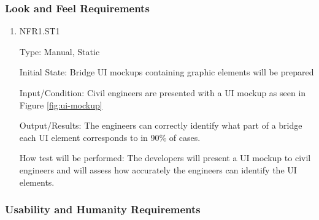 \documentclass[12pt, titlepage]{article}
\begin{document}
\subsubsection{Look and Feel Requirements}

\begin{enumerate}

\item{NFR1.ST1\\}

Type: Manual, Static

Initial State: Bridge UI mockups containing graphic elements will be prepared

Input/Condition: Civil engineers are presented with a UI mockup as seen in Figure \ref{fig:ui-mockup} 

Output/Results: The engineers can correctly identify what part of a bridge each UI element corresponds to in 90\% of cases.

How test will be performed: The developers will present a UI mockup to civil engineers and will assess how accurately the engineers can identify the UI elements.

\end{enumerate}

\subsubsection{Usability and Humanity Requirements}
		
\end{document}
